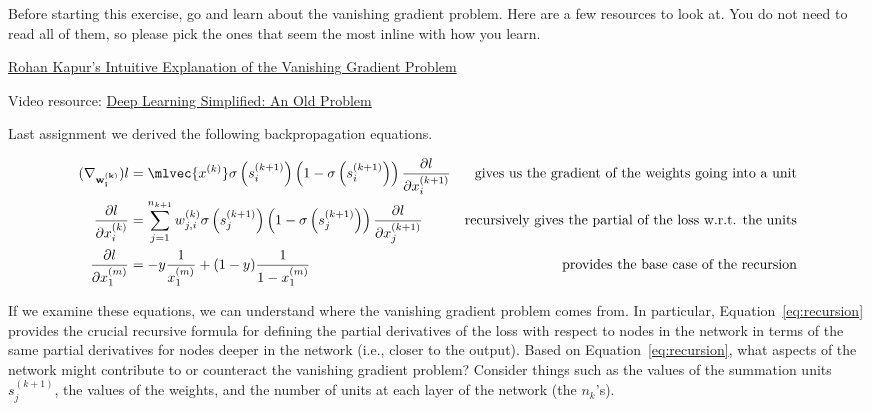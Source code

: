 \documentclass[assignment07_Solutions]{subfiles}
\begin{document}
\begin{exercise}
Before starting this exercise, go and learn about the vanishing gradient problem.  Here are a few resources to look at.  You do not need to read all of them, so please pick the ones that seem the most inline with how you learn.
\begin{externalresources}
\bi
\item \href{https://ayearofai.com/rohan-4-the-vanishing-gradient-problem-ec68f76ffb9b}{Rohan Kapur's Intuitive Explanation of the Vanishing Gradient Problem} 
\item Video resource: \href{https://www.youtube.com/watch?v=SKMpmAOUa2Q}{Deep Learning Simplified: An Old Problem}
\ei
\end{externalresources}


Last assignment we derived the following backpropagation equations.

\begin{align}
(\nabla_{\mathbf{w^{(k)}_i}}) l &= \mlvec{x^{(k)}} \sigma\left (s_i^{(k+1)} \right )\left (1-\sigma\left (s_i^{(k+1)} \right )\right) \frac{\partial l}{\partial x_i^{(k+1)}} & \mbox{gives us the gradient of the weights going into a unit} \\
\frac{\partial l}{\partial x^{(k)}_i} &= \sum_{j=1}^{n_{k+1}} w^{(k)}_{j,i} \sigma \left ( s_{j}^{(k+1)} \right) \left (1-\sigma \left ( s_{j}^{(k+1)} \right)\right) \frac{\partial l}{\partial x^{(k+1)}_j} \label{eq:recursion} & \mbox{recursively gives the partial of the loss w.r.t. the units} \\
\frac{\partial l}{\partial x^{(m)}_1} &= -y\frac{1}{x_1^{(m)}} + (1-y) \frac{1}{1-x_1^{(m)}} & \mbox{provides the base case of the recursion}
\end{align}

\bes
\item If we examine these equations, we can understand where the vanishing gradient problem comes from.  In particular, Equation~\ref{eq:recursion} provides the crucial recursive formula for defining the partial derivatives of the loss with respect to nodes in the network in terms of the same partial derivatives for nodes deeper in the network (i.e., closer to the output).  Based on Equation~\ref{eq:recursion}, what aspects of the network might contribute to or counteract the vanishing gradient problem? Consider things such as the values of the summation units $s_j^{(k+1)}$, the values of the weights, and the number of units at each layer of the network (the $n_k$'s).


\end{exercise}
\end{document}
